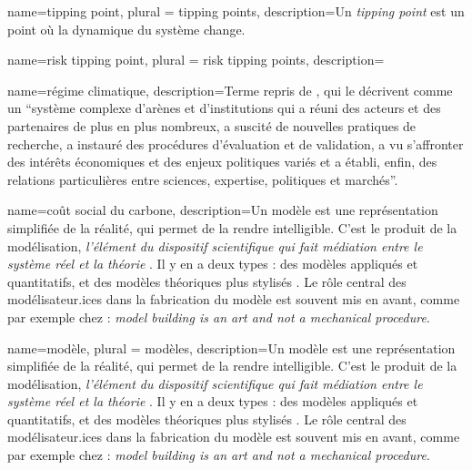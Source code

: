 


{
    name=tipping point, 
    plural = tipping points, 
    description={Un \textit{tipping point} est un point où la dynamique du système change.}
}

{
    name=risk tipping point,
    plural = risk tipping points, 
    description={}
}

{
    name=régime climatique, 
    description={Terme repris de \cite{aykut_gouverner_nodate}, qui le décrivent comme un \enquote{système complexe d’arènes et d’institutions qui a réuni des acteurs et des partenaires de plus en plus nombreux, a suscité de nouvelles pratiques de recherche, a instauré des procédures d’évaluation et de validation, a vu s’affronter des intérêts économiques et des enjeux politiques variés et a établi, enfin, des relations particulières entre sciences, expertise, politiques et marchés}.}
}

{
    name=coût social du carbone, 
    description={Un modèle est une représentation simplifiée de la réalité, qui permet de la rendre intelligible. C'est le produit de la modélisation, \textit{l'élément du dispositif scientifique qui fait médiation entre le système réel et la théorie} \cite{briens_decroissance_2015}. Il y en a deux types : des modèles appliqués et quantitatifs, et des modèles théoriques plus stylisés \cite{briens_decroissance_2015}. Le rôle central des modélisateur.ices dans la fabrication du modèle est souvent mis en avant, comme par exemple chez \cite{beck_epistemic_2016} : \textit{model building is an art and not a mechanical procedure}. \\}
}


{
    name=modèle, 
    plural = modèles, 
    description={Un modèle est une représentation simplifiée de la réalité, qui permet de la rendre intelligible. C'est le produit de la modélisation, \textit{l'élément du dispositif scientifique qui fait médiation entre le système réel et la théorie} \cite{briens_decroissance_2015}. Il y en a deux types : des modèles appliqués et quantitatifs, et des modèles théoriques plus stylisés \cite{briens_decroissance_2015}. Le rôle central des modélisateur.ices dans la fabrication du modèle est souvent mis en avant, comme par exemple chez \cite{beck_epistemic_2016} : \textit{model building is an art and not a mechanical procedure}. \\}
}

